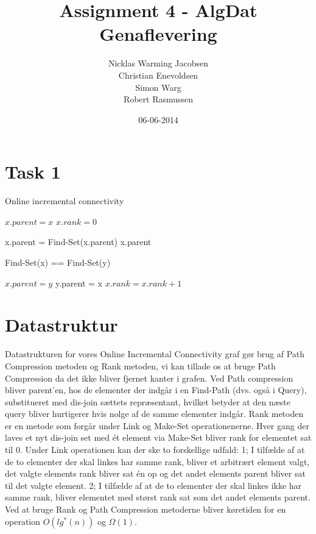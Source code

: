 \documentclass[12pt]{article}
\title{Assignment 4 - AlgDat\\Genaflevering}
\date{06-06-2014}
\author{Nicklas Warming Jacobsen \\Christian Enevoldsen\\Simon Warg \\Robert Rasmussen}
\begin{document}
\maketitle

\section*{Task 1}
\begin{algorithm}
 \caption{Online incremental connectivity}
 \begin{algorithmic}
        \State  {}
        \State $x.parent = x$
        \State $x.rank = 0$
        \EndFunction

        \State{}
                \State x.parent = Find-Set(x.parent)
        \EndIf
        \State \Return x.parent
        \EndFunction

        \State {}
        \State \Return Find-Set(x) == Find-Set(y)
        \EndFunction

        \State {}
                \State $x.parent = y$
        \Else
                \State y.parent = x
                        \State $x.rank = x.rank + 1$
                \EndIf
        \EndIf
        \EndFunction

\end{algorithmic}
\end{algorithm}

\section*{Datastruktur}
Datastrukturen for vores Online Incremental Connectivity graf gør brug af Path Compression metoden og Rank metoden, vi kan tillade os at bruge Path Compression  da det ikke bliver fjernet kanter i grafen. Ved Path compression bliver parent'en, hos de elementer der indgår i en Find-Path (dvs. også i Query), substitueret med dis-join sættets repræsentant, hvilket betyder at den næste query bliver hurtigerer hvis nolge af de samme elementer indgår. Rank metoden er en metode som forgår under Link og Make-Set operationenerne. Hver gang der laves et nyt dis-join set med ét element via Make-Set bliver rank for elementet sat til 0. Under Link operationen kan der ske to forskellige udfald: 1; I tilfælde af at de to elementer der skal linkes har samme rank, bliver et arbitrært element valgt, det valgte elements rank bliver sat én op og det andet elements parent bliver sat til det valgte element. 2; I tilfælde af at de to elementer der skal linkes ikke har samme rank, bliver elementet med størst rank sat som det andet elements parent.
Ved at bruge Rank og Path Compression metoderne bliver køretiden for en operation $O(lg^*(n))$ og $\Omega(1)$.
\newpage
\end{document}

